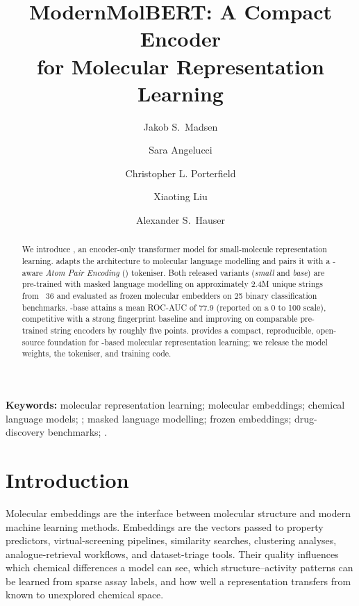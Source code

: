 \documentclass[11pt,a4paper]{article}
\date{}    %
\title{\textbf{ModernMolBERT}: A Compact \selfies{} Encoder\\
       for Molecular Representation Learning}
\author[1,$*$]{Jakob S.\ Madsen}
\author[1]{Sara Angelucci}
\author[1]{Christopher L. Porterfield}
\author[1]{Xiaoting Liu}
\author[1]{Alexander S.\ Hauser}
\affil[1]{%
  Center for Pharmaceutical Data Science Education,
  Department of Drug Design and Pharmacology,
  University of Copenhagen, Denmark
}
\affil[$*$]{%
  Correspondence:
  \href{mailto:jsmadsen@sund.ku.dk}{\texttt{jsmadsen@sund.ku.dk}}
}
\begin{document}

\maketitle

\begin{abstract}
\sloppy
We introduce \model{}, an encoder-only transformer model for small-molecule representation learning. \model{} adapts the \modernbert{} architecture to molecular language modelling and pairs it with a \selfies{}-aware \emph{Atom Pair Encoding} (\ape{}) tokeniser. Both released variants (\emph{small} and \emph{base}) are pre-trained with masked language modelling on approximately {2.4}M unique \selfies{} strings from \chembl{}~36 and evaluated as frozen molecular embedders on 25 binary classification benchmarks. \model{}-base attains a mean ROC-AUC of 77.9 (reported on a 0 to 100 scale), competitive with a strong fingerprint baseline and improving on comparable pre-trained string encoders by roughly five points. \model{} provides a compact, reproducible, open-source foundation for \selfies{}-based molecular representation learning; we release the model weights, the \ape{} tokeniser, and training code.
\end{abstract}

\vspace{0.4em}
\noindent\textbf{Keywords:} molecular representation learning; molecular
embeddings; chemical language models; \selfies{}; masked language modelling;
frozen embeddings; drug-discovery benchmarks; \modernbert{}.


\section{Introduction}%
\label{sec:introduction}

Molecular embeddings are the interface between molecular structure and modern machine learning methods. Embeddings are the vectors passed to property predictors, virtual-screening pipelines, similarity searches, clustering analyses, analogue-retrieval workflows, and dataset-triage tools. Their quality influences which chemical differences a model can see, which structure--activity patterns can be learned from sparse assay labels, and how well a representation transfers from known to unexplored chemical space.
\end{document}
